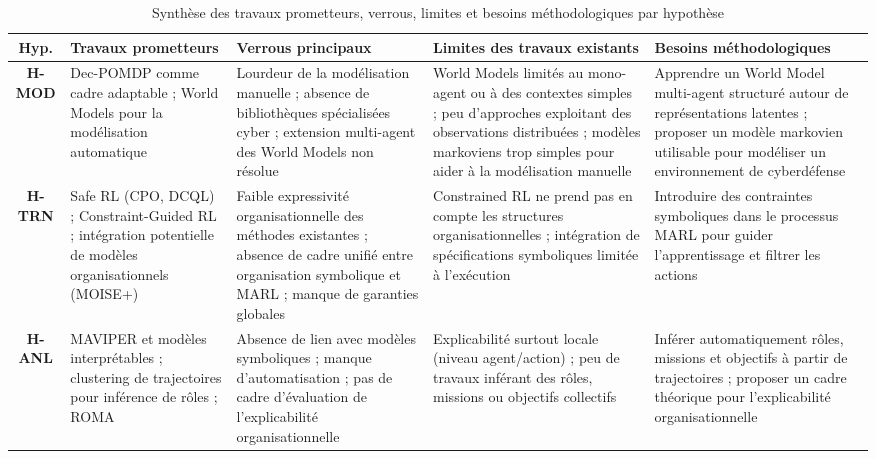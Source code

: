 \begin{table}[ht]
  \centering
  \caption{Synthèse des travaux prometteurs, verrous, limites et besoins méthodologiques par hypothèse}
  \label{tab:synthese_hypotheses}
  \renewcommand{\arraystretch}{1.2}
  {%
    \footnotesize
    \begin{tabularx}{\textwidth}{cXXXX}
      \hline
      \textbf{Hyp.}
       & \textbf{Travaux prometteurs}
       & \textbf{Verrous principaux}
       & \textbf{Limites des travaux existants}
       & \textbf{Besoins méthodologiques}                                                                                                                                                                      \\
      \hline

      \textbf{H-MOD}
       & Dec-POMDP comme cadre adaptable ; World Models pour la modélisation automatique
       & Lourdeur de la modélisation manuelle ; absence de bibliothèques spécialisées cyber ; extension multi-agent des World Models non résolue
       & World Models limités au mono-agent ou à des contextes simples ; peu d’approches exploitant des observations distribuées ; modèles markoviens trop simples pour aider à la modélisation manuelle
       & Apprendre un World Model multi-agent structuré autour de représentations latentes ; proposer un modèle markovien utilisable pour modéliser un environnement de cyberdéfense                           \\
      \hline

      \textbf{H-TRN}
       & Safe RL (CPO, DCQL) ; Constraint-Guided RL ; intégration potentielle de modèles organisationnels (MOISE+)
       & Faible expressivité organisationnelle des méthodes existantes ; absence de cadre unifié entre organisation symbolique et MARL ; manque de garanties globales
       & Constrained RL ne prend pas en compte les structures organisationnelles ; intégration de spécifications symboliques limitée à l’exécution
       & Introduire des contraintes symboliques dans le processus MARL pour guider l’apprentissage et filtrer les actions                                                                                      \\
      \hline

      \textbf{H-ANL}
       & MAVIPER et modèles interprétables ; clustering de trajectoires pour inférence de rôles ; ROMA
       & Absence de lien avec modèles symboliques ; manque d’automatisation ; pas de cadre d’évaluation de l’explicabilité organisationnelle
       & Explicabilité surtout locale (niveau agent/action) ; peu de travaux inférant des rôles, missions ou objectifs collectifs
       & Inférer automatiquement rôles, missions et objectifs à partir de trajectoires ; proposer un cadre théorique pour l’explicabilité organisationnelle                                                    \\
      \hline


\end{tabularx}}
\end{table}
